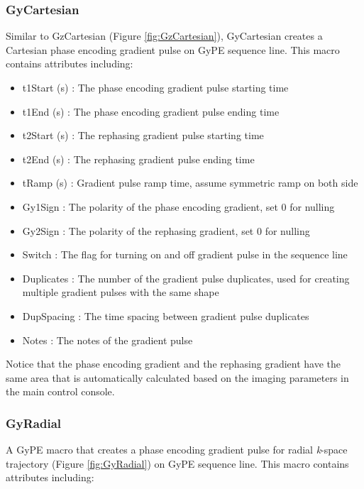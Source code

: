 \documentclass{book}%
\begin{document}
\subsubsection{GyCartesian}

Similar to GzCartesian (Figure \ref{fig:GzCartesian}), GyCartesian creates a Cartesian phase encoding gradient pulse on GyPE sequence line. This macro contains attributes including:

\begin{itemize}
	\item t1Start (s) : The phase encoding gradient pulse starting time
	\item t1End (s) : The phase encoding gradient pulse ending time
	\item t2Start (s) : The rephasing gradient pulse starting time
	\item t2End (s) : The rephasing gradient pulse ending time
	\item tRamp (s) : Gradient pulse ramp time, assume symmetric ramp on both side
	\item Gy1Sign : The polarity of the phase encoding gradient, set 0 for nulling
	\item Gy2Sign : The polarity of the rephasing gradient, set 0 for nulling
	\item Switch : The flag for turning on and off gradient pulse in the sequence line
	\item Duplicates : The number of the gradient pulse duplicates, used for creating multiple gradient pulses with the same shape
	\item DupSpacing : The time spacing between gradient pulse duplicates
	\item Notes : The notes of the gradient pulse 
\end{itemize}

Notice that the phase encoding gradient and the rephasing gradient have the same area that is automatically calculated based on the imaging parameters in the main control console.


\subsubsection{GyRadial}

A GyPE macro that creates a phase encoding gradient pulse for radial \textit{k}-space trajectory (Figure \ref{fig:GyRadial}) on GyPE sequence line. This macro contains attributes including:
\end{document}
